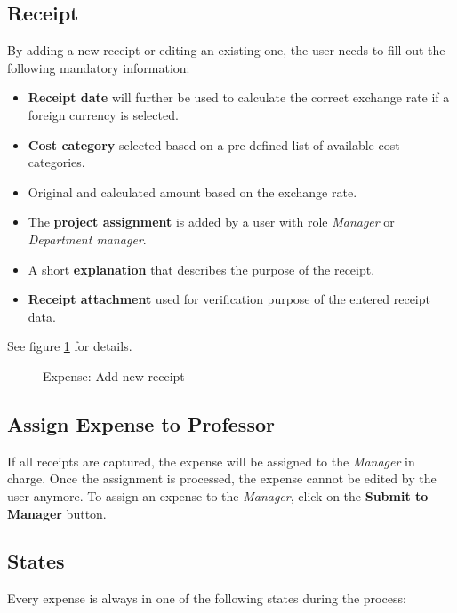 \subsection{Receipt}
\label{sec:addreceipt}
By adding a new receipt or editing an existing one, the user needs to fill out the following mandatory information:
\begin{itemize}
    \item \textbf{Receipt date} will further be used to calculate the correct exchange rate if a foreign currency is selected.
    \item \textbf{Cost category} selected based on a pre-defined list of available cost categories.
    \item Original and calculated amount based on the exchange rate.
    \item The \textbf{project assignment} is added by a user with role \textit{Manager} or \textit{Department manager}.
    \item A short \textbf{explanation} that describes the purpose of the receipt.
    \item \textbf{Receipt attachment} used for verification purpose of the entered receipt data.
\end{itemize}

See figure \ref{fig:expenses-add01} for details.


\begin{figure}[H]
    \centering
    \caption{Expense: Add new receipt}
    \label{fig:expenses-add01}
\end{figure}

\subsection{Assign Expense to Professor}
If all receipts are captured, the expense will be assigned to the \textit{Manager} in charge. Once the assignment is processed, the expense cannot be edited by the user anymore. To assign an expense to the \textit{Manager}, click on the \textbf{Submit to Manager} button.

\subsection{States}
\label{sec:states}
Every expense is always in one of the following states during the process:

